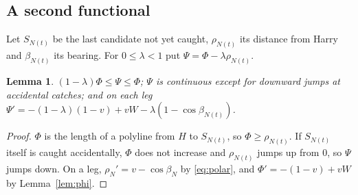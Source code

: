 \documentclass[11pt]{article}
\newtheorem{lemma}{Lemma}
\theoremstyle{remark}\newtheorem{remark}{Remark}
\begin{document}
\subsection*{A second functional}
Let $S_{N(t)}$ be the last candidate not yet caught, $\rho_{N(t)}$ its distance from Harry and $\beta_{N(t)}$ its bearing. For $0\le\lambda<1$
put $\Psi=\Phi-\lambda\rho_{N(t)}$.

\begin{lemma}\label{lem:B1}
$(1-\lambda)\Phi\le\Psi\le\Phi$; $\Psi$ is continuous except for downward jumps at accidental catches; and on each leg
$\Psi'=-(1-\lambda)(1-v)+vW-\lambda(1-\cos\beta_{N(t)})$.
\end{lemma}
\begin{proof}
$\Phi$ is the length of a polyline from $H$ to $S_{N(t)}$, so $\Phi\ge\rho_{N(t)}$. If $S_{N(t)}$ itself is caught accidentally, $\Phi$
does not increase and $\rho_{N(t)}$ jumps up from $0$, so $\Psi$ jumps down. On a leg, $\rho_{N}'=v-\cos\beta_N$ by \eqref{eq:polar},
and $\Phi'=-(1-v)+vW$ by Lemma~\ref{lem:phi}.
\end{proof}
\end{document}
